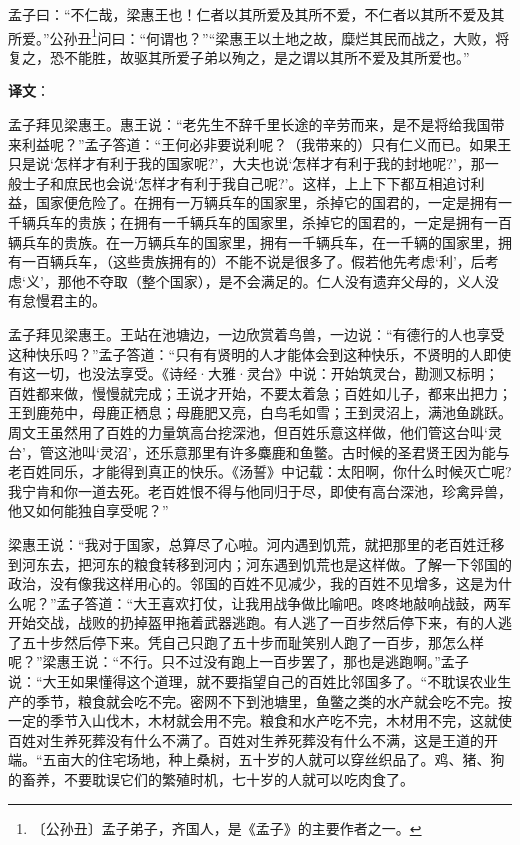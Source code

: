 \documentclass[12pt,UTF-8,openany]{ctexbook}
\begin{document}
\begin{normalsize}
    孟子曰：“不仁哉，梁惠王也！仁者以其所爱及其所不爱，不仁者以其所不爱及其所爱。”公孙丑\footnote{〔公孙丑〕孟子弟子，齐国人，是《孟子》的主要作者之一。}问曰：“何谓也？”“梁惠王以土地之故，糜烂其民而战之，大败，将复之，恐不能胜，故驱其所爱子弟以殉之，是之谓以其所不爱及其所爱也。”
\end{normalsize}


\newpage

\textbf{译文}：

\vspace{1em}

\begin{normalsize}
    
    孟子拜见梁惠王。惠王说：“老先生不辞千里长途的辛劳而来，是不是将给我国带来利益呢？”孟子答道：“王何必非要说利呢？（我带来的）只有仁义而已。如果王只是说‘怎样才有利于我的国家呢?’，大夫也说‘怎样才有利于我的封地呢?’，那一般士子和庶民也会说‘怎样才有利于我自己呢?’。这样，上上下下都互相追讨利益，国家便危险了。在拥有一万辆兵车的国家里，杀掉它的国君的，一定是拥有一千辆兵车的贵族；在拥有一千辆兵车的国家里，杀掉它的国君的，一定是拥有一百辆兵车的贵族。在一万辆兵车的国家里，拥有一千辆兵车，在一千辆的国家里，拥有一百辆兵车，（这些贵族拥有的）不能不说是很多了。假若他先考虑‘利’，后考虑‘义’，那他不夺取（整个国家），是不会满足的。仁人没有遗弃父母的，义人没有怠慢君主的。
    
    孟子拜见梁惠王。王站在池塘边，一边欣赏着鸟兽，一边说：“有德行的人也享受这种快乐吗？”孟子答道：“只有有贤明的人才能体会到这种快乐，不贤明的人即使有这一切，也没法享受。《诗经·大雅·灵台》中说：开始筑灵台，勘测又标明；百姓都来做，慢慢就完成；王说才开始，不要太着急；百姓如儿子，都来出把力；王到鹿苑中，母鹿正栖息；母鹿肥又亮，白鸟毛如雪；王到灵沼上，满池鱼跳跃。周文王虽然用了百姓的力量筑高台挖深池，但百姓乐意这样做，他们管这台叫‘灵台’，管这池叫‘灵沼’，还乐意那里有许多麋鹿和鱼鳖。古时候的圣君贤王因为能与老百姓同乐，才能得到真正的快乐。《汤誓》中记载：太阳啊，你什么时候灭亡呢?我宁肯和你一道去死。老百姓恨不得与他同归于尽，即使有高台深池，珍禽异兽，他又如何能独自享受呢？”
    
    梁惠王说：“我对于国家，总算尽了心啦。河内遇到饥荒，就把那里的老百姓迁移到河东去，把河东的粮食转移到河内；河东遇到饥荒也是这样做。了解一下邻国的政治，没有像我这样用心的。邻国的百姓不见减少，我的百姓不见增多，这是为什么呢？”孟子答道：“大王喜欢打仗，让我用战争做比喻吧。咚咚地敲响战鼓，两军开始交战，战败的扔掉盔甲拖着武器逃跑。有人逃了一百步然后停下来，有的人逃了五十步然后停下来。凭自己只跑了五十步而耻笑别人跑了一百步，那怎么样呢？”梁惠王说：“不行。只不过没有跑上一百步罢了，那也是逃跑啊。”孟子说：“大王如果懂得这个道理，就不要指望自己的百姓比邻国多了。“不耽误农业生产的季节，粮食就会吃不完。密网不下到池塘里，鱼鳖之类的水产就会吃不完。按一定的季节入山伐木，木材就会用不完。粮食和水产吃不完，木材用不完，这就使百姓对生养死葬没有什么不满了。百姓对生养死葬没有什么不满，这是王道的开端。“五亩大的住宅场地，种上桑树，五十岁的人就可以穿丝织品了。鸡、猪、狗的畜养，不要耽误它们的繁殖时机，七十岁的人就可以吃肉食了。
    

\end{normalsize}
\end{document}
